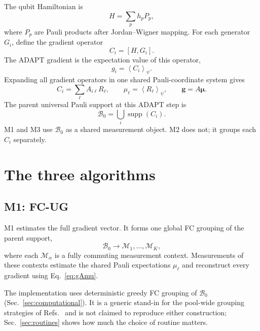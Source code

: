 \documentclass[10pt]{article}
\newcommand{\expect}[1]{\left\langle #1 \right\rangle}
\newcommand{\comm}[2]{\left[#1,#2\right]}
\newcommand{\supp}{\operatorname{supp}}
\begin{document}
The qubit Hamiltonian is
\begin{equation}
  H=\sum_p h_p P_p,
\end{equation}
where $P_p$ are Pauli products after Jordan--Wigner mapping. For each generator $G_i$, define the gradient operator
\begin{equation}
  C_i = \comm{H}{G_i} .
\end{equation}
The ADAPT gradient is the expectation value of this operator,
\begin{equation}
  g_i=\expect{C_i}_{\psi}.
\end{equation}
Expanding all gradient operators in one shared Pauli-coordinate system gives
\begin{equation}
  C_i=\sum_{\ell} A_{i\ell}R_{\ell},
  \qquad
  \mu_\ell=\expect{R_\ell}_{\psi},
  \qquad
  \bm g = A\bm\mu .
  \label{eq:gAmu}
\end{equation}
The parent universal Pauli support at this ADAPT step is
\begin{equation}
  \mathcal B_0=\bigcup_i \supp(C_i).
  \label{eq:B0}
\end{equation}
M1 and M3 use $\mathcal B_0$ as a shared measurement object. M2 does not; it groups each $C_i$ separately.

\section{The three algorithms}
\label{sec:algorithms}

\subsection{M1: FC-UG}

M1 estimates the full gradient vector. It forms one global FC grouping of the parent support,
\begin{equation}
  \mathcal B_0 \longrightarrow \mathcal M_1,\ldots,\mathcal M_K,
\end{equation}
where each $\mathcal M_\alpha$ is a fully commuting measurement context. Measurements of these contexts estimate the shared Pauli expectations $\mu_\ell$ and reconstruct every gradient using Eq.~\eqref{eq:gAmu}.

The implementation uses deterministic greedy FC grouping of $\mathcal B_0$ (Sec.~\ref{sec:computational}). It is a generic stand-in for the pool-wide grouping strategies of Refs.~\cite{Anastasiou2023ReallyMeasure,Shkolnikov2023Avoiding} and is not claimed to reproduce either construction; Sec.~\ref{sec:routines} shows how much the choice of routine matters.
\end{document}

